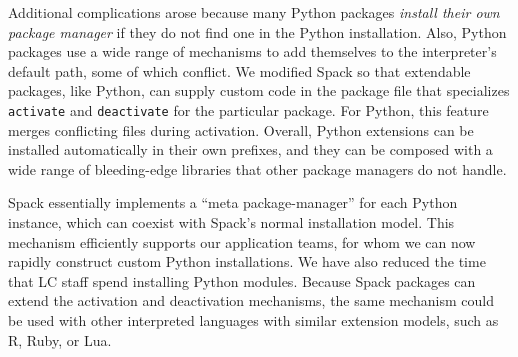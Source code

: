 Additional complications arose because many Python packages 
{\it install their own package manager} if they do not find one in the 
Python installation. Also, Python packages use a wide range of mechanisms
to add themselves to the interpreter's default path, some of which conflict. 
We modified Spack so that extendable packages, like Python, can supply 
custom code in the package file that specializes {\tt activate} and 
{\tt deactivate} for the particular package. For Python, this feature 
merges conflicting files during activation. Overall, Python extensions can
be installed automatically in their own prefixes, and they can be composed
with a wide range of bleeding-edge libraries that other package managers do
not handle.


Spack essentially implements a ``meta package-manager'' for each Python
instance, which can coexist with Spack's normal installation model.
This mechanism efficiently supports our application teams, for whom we can
now rapidly construct custom Python installations.  We have also reduced
the time that LC staff spend installing Python modules.
Because Spack packages can extend the activation and deactivation mechanisms,
the same mechanism could be used with other interpreted languages with 
similar extension models, such as R, Ruby, or Lua.
